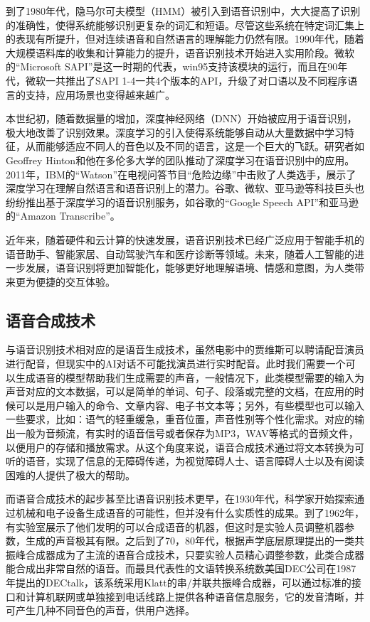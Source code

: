 到了1980年代，隐马尔可夫模型（HMM）被引入到语音识别中，大大提高了识别的准确性，使得系统能够识别更复杂的词汇和短语。尽管这些系统在特定词汇集上的表现有所提升，但对连续语音和自然语言的理解能力仍然有限。1990年代，随着大规模语料库的收集和计算能力的提升，语音识别技术开始进入实用阶段。微软的“Microsoft SAPI”是这一时期的代表，win95支持该模块的运行，而且在90年代，微软一共推出了SAPI 1-4一共4个版本的API，升级了对口语以及不同程序语言的支持，应用场景也变得越来越广。

本世纪初，随着数据量的增加，深度神经网络（DNN）开始被应用于语音识别，极大地改善了识别效果。深度学习的引入使得系统能够自动从大量数据中学习特征，从而能够适应不同人的音色以及不同的语言，这是一个巨大的飞跃。研究者如Geoffrey Hinton和他在多伦多大学的团队推动了深度学习在语音识别中的应用。2011年，IBM的“Watson”在电视问答节目“危险边缘”中击败了人类选手，展示了深度学习在理解自然语言和语音识别上的潜力。谷歌、微软、亚马逊等科技巨头也纷纷推出基于深度学习的语音识别服务，如谷歌的“Google Speech API”和亚马逊的“Amazon Transcribe”。

近年来，随着硬件和云计算的快速发展，语音识别技术已经广泛应用于智能手机的语音助手、智能家居、自动驾驶汽车和医疗诊断等领域。未来，随着人工智能的进一步发展，语音识别将更加智能化，能够更好地理解语境、情感和意图，为人类带来更为便捷的交互体验。

\subsection{语音合成技术}

与语音识别技术相对应的是语音生成技术，虽然电影中的贾维斯可以聘请配音演员进行配音，但现实中的AI对话不可能找演员进行实时配音。此时我们需要一个可以生成语音的模型帮助我们生成需要的声音，一般情况下，此类模型需要的输入为声音对应的文本数据，可以是简单的单词、句子、段落或完整的文档，在应用的时候可以是用户输入的命令、文章内容、电子书文本等；另外，有些模型也可以输入一些要求，比如：语气的轻重缓急，重音位置，声音性别等个性化需求。对应的输出一般为音频流，有实时的语音信号或者保存为MP3，WAV等格式的音频文件，以便用户的存储和播放需求。从这个角度来说，语音合成技术通过将文本转换为可听的语音，实现了信息的无障碍传递，为视觉障碍人士、语言障碍人士以及有阅读困难的人提供了极大的帮助。

而语音合成技术的起步甚至比语音识别技术更早，在1930年代，科学家开始探索通过机械和电子设备生成语音的可能性，但并没有什么实质性的成果。到了1962年，有实验室展示了他们发明的可以合成语音的机器，但这时是实验人员调整机器参数，生成的声音极其有限。之后到了70，80年代，根据声学底层原理提出的一类共振峰合成器成为了主流的语音合成技术，只要实验人员精心调整参数，此类合成器能合成出非常自然的语音。而最具代表性的文语转换系统数美国DEC公司在1987年提出的DECtalk，该系统采用Klatt的串/并联共振峰合成器，可以通过标准的接口和计算机联网或单独接到电话线路上提供各种语音信息服务，它的发音清晰，并可产生几种不同音色的声音，供用户选择。

